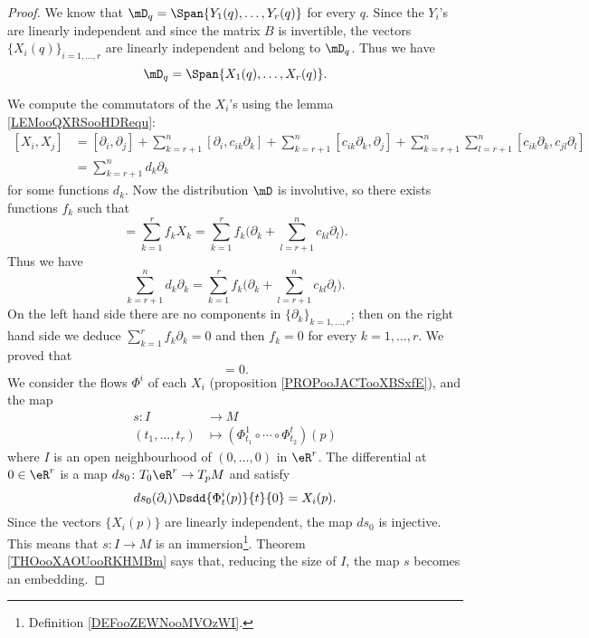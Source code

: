 \begin{proof}
	We know that \( \mD_q=\Span\{ Y_1(q),\ldots, Y_r(q) \}\) for every \( q\). Since the \( Y_i\)'s are linearly independent and since the matrix \( B\) is invertible, the vectors \( \{ X_i(q) \}_{i=1,\ldots, r}\) are linearly independent and belong to \( \mD_q\). Thus we have
	\begin{equation}
		\mD_q=\Span\{ X_1(q),\ldots, X_r(q)  \}.
	\end{equation}

	We compute the commutators of the \( X_i\)'s using the lemma \ref{LEMooQXRSooHDRequ}:
	\begin{subequations}
		\begin{align}
			[X_i,X_j] & =[\partial_i,\partial_j]+\sum_{k=r+1}^n[\partial_i,c_{ik}\partial_k]+\sum_{k=r+1}^n[c_{ik}\partial_k,\partial_j]+\sum_{k=r+1}^n\sum_{l=r+1}^n[c_{ik}\partial_k,c_{jl}\partial_l] \\
			          & =\sum_{k=r+1}^nd_k\partial_k
		\end{align}
	\end{subequations}
	for some functions \( d_k\). Now the distribution \( \mD\) is involutive, so there exists functions \( f_k\) such that
	\begin{equation}
		[X_i,X_j]=\sum_{k=1}^rf_kX_k=\sum_{k=1}^rf_k\big( \partial_k+\sum_{l=r+1}^nc_{kl}\partial_l \big).
	\end{equation}
	Thus we have
	\begin{equation}
		\sum_{k=r+1}^nd_k\partial_k=\sum_{k=1}^rf_k\big( \partial_k+\sum_{l=r+1}^nc_{kl}\partial_l \big).
	\end{equation}
	On the left hand side there are no components in \( \{ \partial_k \}_{k=1,\ldots, r}\); then on the right hand side we deduce \( \sum_{k=1}^rf_k\partial_k=0\) and then \( f_k=0\) for every \( k=1,\ldots, r\). We proved that
	\begin{equation}
		[X_i,X_j]=0.
	\end{equation}
	We consider the flows \( \Phi^i\) of each \( X_i\) (proposition \ref{PROPooJACTooXBSxfE}), and the map
	\begin{equation}
		\begin{aligned}
			s\colon I         & \to M                                                   \\
			(t_1,\ldots, t_r) & \mapsto (\Phi_{t_1}^1\circ \cdots\circ \Phi_{t_2}^t)(p)
		\end{aligned}
	\end{equation}
	where \( I\) is an open neighbourhood of \( (0,\ldots, 0)\) in \( \eR^r\). The differential at \( 0\in \eR^r\) is a map \( ds_0\colon T_0\eR^r\to T_pM\) and satisfy
	\begin{equation}
		ds_0(\partial_i)\Dsdd{ \Phi_t^i(p) }{t}{0}=X_i(p).
	\end{equation}
	Since the vectors \( \{ X_i(p) \}\) are linearly independent, the map \( ds_0\) is injective. This means that \( s\colon I\to M\) is an immersion\footnote{Definition \ref{DEFooZEWNooMVOzWI}.}. Theorem \ref{THOooXAOUooRKHMBm} says that, reducing the size of \( I\), the map \( s\) becomes an embedding.


\end{proof}
